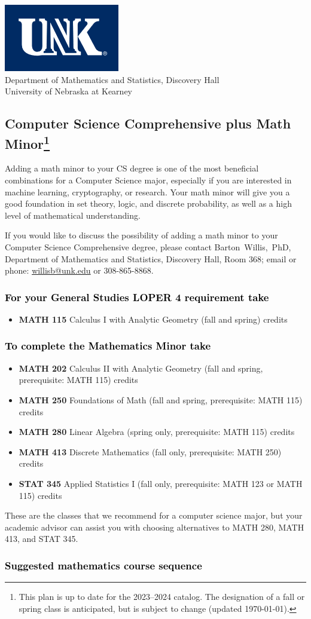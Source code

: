 \documentclass[10pt]{article}
\makeatletter
\newcommand{\calcone}{\textbf{MATH 115} Calculus I with Analytic Geometry (fall and spring) \dotfill 5 credits}
\newcommand{\calctwo}{\textbf{MATH 202} Calculus II with Analytic Geometry (fall and spring, prerequisite: MATH 115) \dotfill 5 credits }
\newcommand{\foundations}{\textbf{MATH 250} Foundations of Math (fall and spring, prerequisite: MATH 115)  \dotfill 3 credits}
\newcommand{\linear}{\textbf{MATH 280} Linear Algebra (spring only, prerequisite: MATH 115) \dotfill 3 credits}
\newcommand{\linearshort}{MATH 280}
\newcommand{\discrete}{\textbf{MATH 413} Discrete Mathematics  (fall only, prerequisite: MATH 250)\dotfill 3 credits}
\newcommand{\discreteshort}{MATH 413}
\newcommand{\appliedstat}{\textbf{STAT 345} Applied Statistics I (fall only, prerequisite: MATH 123 or MATH 115) \dotfill 3 credits}
\newcommand{\appliedstatshort}{STAT 345}
\newcommand{\contactbw}{\mbox{Barton Willis, PhD}, Department of Mathematics and Statistics,  Discovery Hall, Room 368;
email or phone: \href{mailto:willisb@unk.edu}{willisb@unk.edu} or 308-865-8868.}
\newcommand{\forinfo}[2]{If you would like to discuss the possibility of adding a math {#1} to your {#2}, please contact \contactbw}
\newcommand{\catalog}{2023--2024 }
\newcommand{\LOPER}{LOPER\xspace}
\newcommand{\myfootnote}{\footnote{This plan is up to date for  the \catalog catalog. The designation of a fall or spring class is 
anticipated, but  is subject to change (updated \today).}}
\newcommand{\myheading}{
\begin{flushleft}
\includegraphics[scale=0.35]{unk-logo}\\
\setcounter{footnote}{0}
\vspace{0.25in}
 \textcolor{unkblue}{Department of Mathematics and Statistics, Discovery Hall} \\
  \textcolor{unkblue}{University of Nebraska at Kearney}
\end{flushleft}}
\makeatother
\begin{document}
\myheading


\subsection*{\textbf{\textcolor{unkblue}{Computer Science Comprehensive plus Math Minor\myfootnote}}}

Adding a math minor to your CS degree is one of the most beneficial 
combinations for a Computer Science major, especially if you are interested 
in machine learning, cryptography, or research. Your math minor will 
give you a good foundation in set theory, logic, and discrete probability, as 
well as a high level of mathematical understanding.

\forinfo{minor}{Computer Science Comprehensive degree}

\vspace{-0.1in}

\subsubsection*{\textcolor{black}{For your General Studies \LOPER 4 requirement take}}
\begin{itemize}
\item  \calcone
\end{itemize}

\subsubsection*{\textcolor{black}{To complete the Mathematics Minor take}}
\begin{itemize}
\item \calctwo
\item \foundations
\item \linear
\item \discrete
\item \appliedstat
\end{itemize}
\vspace{0.1in}
These are the classes that we recommend for a computer science major,
but your academic advisor can assist you with choosing alternatives 
to \linearshort, \discreteshort, and \appliedstatshort.

\vspace{-0.1in}
\subsubsection*{\textcolor{black}{Suggested mathematics course sequence}}
\end{document}
